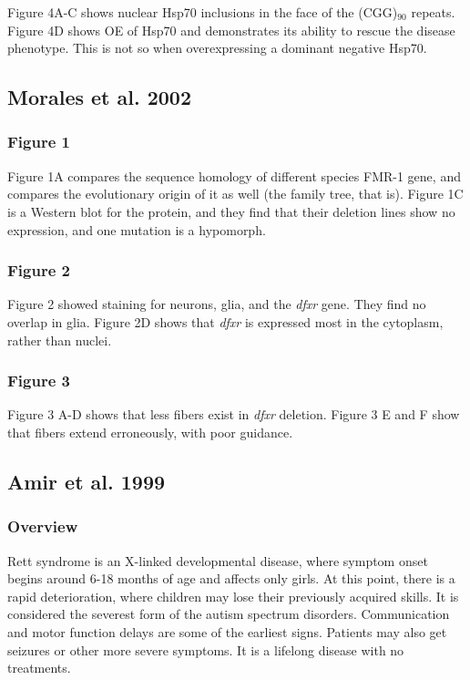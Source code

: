 Figure 4A-C shows nuclear Hsp70 inclusions in the face of the (CGG)$_{90}$ repeats. Figure 4D shows OE of Hsp70 and demonstrates its ability to rescue the disease phenotype. This is not so when overexpressing a dominant negative Hsp70.

\subsection*{Morales et al. 2002}

\subsubsection*{Figure 1}

Figure 1A compares the sequence homology of different species FMR-1 gene, and compares the evolutionary origin of it as well (the family tree, that is). Figure 1C is a Western blot for the protein, and they find that their deletion lines show no expression, and one mutation is a hypomorph. 

\subsubsection*{Figure 2}

Figure 2 showed staining for neurons, glia, and the \textit{dfxr} gene. They find no overlap in glia. Figure 2D shows that \textit{dfxr} is expressed most in the cytoplasm, rather than nuclei. 

\subsubsection*{Figure 3}

Figure 3 A-D shows that less fibers exist in \textit{dfxr} deletion. Figure 3 E and F show that fibers extend erroneously, with poor guidance. 


\subsection*{Amir et al. 1999}

\subsubsection*{Overview}

Rett syndrome is an X-linked developmental disease, where symptom onset begins around 6-18 months of age and affects only girls. At this point, there is a rapid deterioration, where children may lose their previously acquired skills. It is considered the severest form of the autism spectrum disorders. Communication and motor function delays are some of the earliest signs. Patients may also get seizures or other more severe symptoms. It is a lifelong disease with no treatments.\newline

